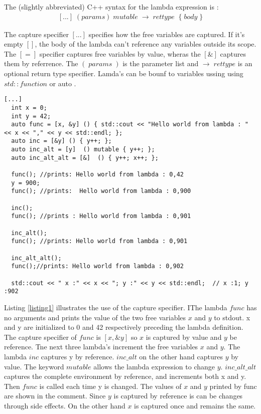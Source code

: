 \documentclass[12pt,fleqn]{article}
\begin{document}
The (slightly abbreviated) C++ syntax for the lambda expression is \cite{lambdaref}:
\[
\begin{array}{rll}
[...] \;  (params) \; mutable \;  \rightarrow \; rettype \;\; \{ \; body \;\}
\end{array}
\]

The capture specifier $[...]$ specifies how the free variables are captured.
If it's empty $[]$, the body of the lambda can't reference any variables outside its scope. 
The $[=]$ specifier captures free variables by value, wheras the $[\&]$ captures them by referrence. 
The $(\; params\;)$ is the parameter list and $\rightarrow \; rettype$ is an optional return type specifier. 
Lamda's can be bounf to variables ussing using $std::function$ \cite{std::function} or auto \cite{auto}.

\begin{lstlisting}[caption=various ways lambda's capture the environment , label=listing1]
[...]
  int x = 0;
  int y = 42;
  auto func = [x, &y] () { std::cout << "Hello world from lambda : " << x << "," << y << std::endl; };
  auto inc = [&y] () { y++; };
  auto inc_alt = [y]  () mutable { y++; };
  auto inc_alt_alt = [&]  () { y++; x++; };

  func(); //prints: Hello world from lambda : 0,42
  y = 900;
  func(); //prints:  Hello world from lambda : 0,900

  inc();
  func(); //prints : Hello world from lambda : 0,901

  inc_alt();
  func(); //prints: Hello world from lambda : 0,901

  inc_alt_alt(); 
  func();//prints: Hello world from lambda : 0,902

  std::cout << " x :" << x << "; y :" << y << std::endl;  // x :1; y :902

\end{lstlisting}
Listing \ref{listing1} illustrates the use of the capture specifier.
IThe lambda $func$ has no arguments and prints the value of the two free variables $x$ and $y$ to stdout. 
x and y are initialized to 0 and 42 respectively preceding the lambda definition. 
The capture specifier of $func$ is $[x,\&y]$ so $x$ is captured by value and $y$ be reference.
Tne next three lambda's increment the free variables $x$ and $y$.
The lambda $inc$ captures y by reference.
$inc\_alt$ on the other hand captures $y$ by value. 
The keyword $mutable$ allows the lambda expression to change $y$.
$inc\_alt\_alt$ captures the complete environment by reference, and increments both x and y.
Then $func$ is called each time y is changed.
The values of $x$ and $y$ printed by func are shown in the comment.  
Since $y$ is captured by reference is can be changes through side effects.
On the other hand $x$ is captured once and remains the same.
\end{document}
